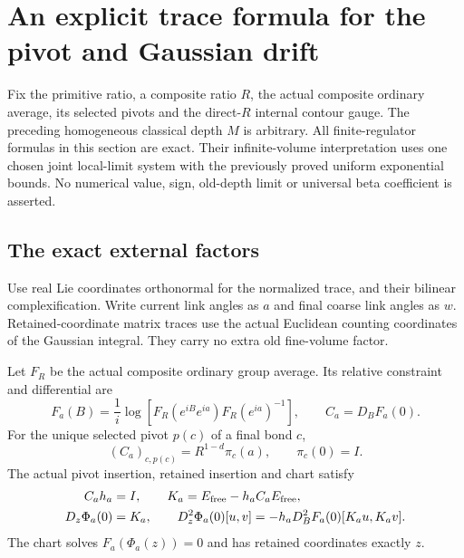 \section{An explicit trace formula for the pivot and Gaussian drift}
\label{dmt-section}

Fix the primitive ratio, a composite ratio \(R\), the actual
composite ordinary average, its selected pivots and the direct-\(R\)
internal contour gauge. The preceding homogeneous classical
depth \(M\) is arbitrary. All finite-regulator formulas in this
section are exact. Their infinite-volume interpretation uses one
chosen joint local-limit system with the previously proved uniform
exponential bounds. No numerical value, sign, old-depth limit or
universal beta coefficient is asserted.

\subsection{The exact external factors}
\label{dmt-definitions-section}

Use real Lie coordinates orthonormal for the normalized trace,
and their bilinear complexification. Write current link angles
as \(a\) and final coarse link angles as \(w\). Retained-coordinate
matrix traces use the actual Euclidean counting coordinates of
the Gaussian integral. They carry no extra old fine-volume factor.

Let \(F_R\) be the actual composite ordinary group average. Its
relative constraint and differential are
\begin{equation}
 F_a(B)=\frac1i\log\!\left[
     F_R(e^{iB}e^{ia})F_R(e^{ia})^{-1}\right],
 \qquad C_a=D_BF_a(0).
 \label{dmt-relative-constraint}
\end{equation}
For the unique selected pivot \(p(c)\) of a final bond \(c\),
\begin{equation}
 (C_a)_{c,p(c)}=R^{1-d}\pi_c(a),\qquad
 \pi_c(0)=I.
 \label{dmt-pivot-block}
\end{equation}
The actual pivot insertion, retained insertion and chart satisfy
\begin{align}
 C_ah_a&=I,\qquad
 K_a=E_{\rm free}-h_aC_aE_{\rm free},\notag\\
 D_z\Phi_a(0)&=K_a,\qquad
 D_z^2\Phi_a(0)[u,v]
       =-h_aD_B^2F_a(0)[K_au,K_av].
 \label{dmt-chart-identities}
\end{align}
The chart solves \(F_a(\Phi_a(z))=0\) and has retained
coordinates exactly \(z\).

